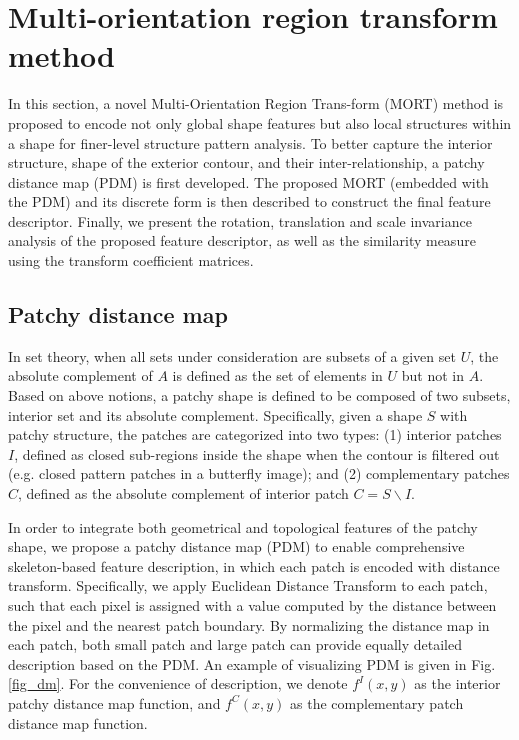 \documentclass[letterpaper]{article} %
\begin{document}
\section{Multi-orientation region transform method}

In this section, a novel Multi-Orientation Region Trans-form (MORT) method is proposed to encode not only global shape features but also local structures within a shape for finer-level structure pattern analysis. To better capture the interior structure, shape of the exterior contour, and their inter-relationship, a patchy distance map (PDM) is first developed. The proposed MORT (embedded with the PDM) and its discrete form is then described to construct the final feature descriptor. Finally, we present the rotation, translation and scale invariance analysis of the proposed feature descriptor, as well as the similarity measure using the transform coefficient matrices.

\subsection{Patchy distance map}
In set theory, when all sets under consideration are subsets of a given set $U$, the absolute complement of $A$ is defined as the set of elements in $U$ but not in $A$. Based on above notions, a patchy shape is defined to be composed of two subsets, interior set and its absolute complement. Specifically, given a shape $S$ with patchy structure, the patches are categorized into two types: (1) interior patches $I$, defined as closed sub-regions inside the shape when the contour is filtered out (e.g. closed pattern patches in a butterfly image); and (2) complementary patches $C$, defined as the absolute complement of interior patch $C=S \backslash I$. 

In order to integrate both geometrical and topological features of the patchy shape, we propose a patchy distance map (PDM) to enable comprehensive skeleton-based feature description, in which each patch is encoded with distance transform. Specifically, we apply Euclidean Distance Transform \cite{12} to each patch, such that each pixel is assigned with a value computed by the distance between the pixel and the nearest patch boundary. By normalizing the distance map in each patch, both small patch and large patch can provide equally detailed description based on the PDM. An example of visualizing PDM is given in Fig. \ref{fig_dm}. For the convenience of description, we denote $f^I (x,y)$ as the interior patchy distance map function, and $f^C (x,y)$ as the complementary patch distance map function.
\end{document}
